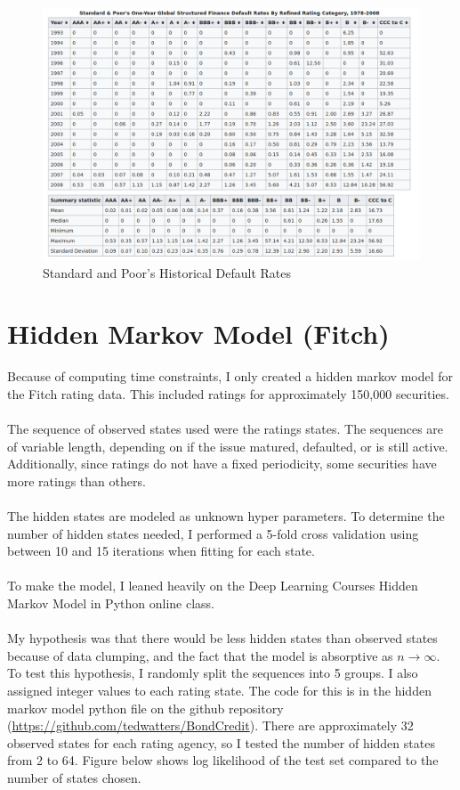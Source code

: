 \documentclass[a4paper, 11pt]{article}
\begin{document}
\begin{figure}[h]
	\caption{Standard and Poor's Historical Default Rates\cite{wiki_bondcredit}}
	\includegraphics[width=\textwidth]{SPR_Historical_Wikipedia.png}
\end{figure}

\section{Hidden Markov Model (Fitch)}

Because of computing time constraints, I only created a hidden markov model for the Fitch rating data. This included ratings for approximately 150,000 securities.\\
\\
The sequence of observed states used were the ratings states. The sequences are of variable length, depending on if the issue matured, defaulted, or is still active. Additionally, since ratings do not have a fixed periodicity, some securities have more ratings than others.\\
\\
The hidden states are modeled as unknown hyper parameters. To determine the number of hidden states needed, I performed a 5-fold cross validation using between 10 and 15 iterations when fitting for each state.\\
\\
To make the model, I leaned heavily on the Deep Learning Courses Hidden Markov Model in Python online class.\cite{deeplearning-lecture}\cite{deeplearning-github}\\
\\
My hypothesis was that there would be less hidden states than observed states because of data clumping, and the fact that the model is absorptive as $n \longrightarrow \infty$. To test this hypothesis, I randomly split the sequences into 5 groups. I also assigned integer values to each rating state. The code for this is in the hidden markov model python file on the github repository (\url{https://github.com/tedwatters/BondCredit}). There are approximately 32 observed states for each rating agency, so I tested the number of hidden states from 2 to 64. Figure below shows log likelihood of the test set compared to the number of states chosen.
\end{document}
